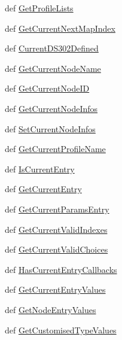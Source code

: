 \begin{CompactItemize}
def \hyperlink{classnodemanager_1_1NodeManager_26b88c9b0e6e72934ec591e8b974000c}{Get\-Profile\-Lists}
\item 
def \hyperlink{classnodemanager_1_1NodeManager_2db6aadfa79b0b2a9cfd09e45b71f03c}{Get\-Current\-Next\-Map\-Index}
\item 
def \hyperlink{classnodemanager_1_1NodeManager_5e8172882f6252e45bdb59f7248c83d6}{Current\-DS302Defined}
\item 
def \hyperlink{classnodemanager_1_1NodeManager_e2bbc613898b9926f47be95072c64160}{Get\-Current\-Node\-Name}
\item 
def \hyperlink{classnodemanager_1_1NodeManager_72f10793222cbd6d4b621ce748acf141}{Get\-Current\-Node\-ID}
\item 
def \hyperlink{classnodemanager_1_1NodeManager_9305e3ffee31917d098f2131301ec1a5}{Get\-Current\-Node\-Infos}
\item 
def \hyperlink{classnodemanager_1_1NodeManager_300207ada996fc01af2b3a2ab882d799}{Set\-Current\-Node\-Infos}
\item 
def \hyperlink{classnodemanager_1_1NodeManager_eee0741327de398df87e8916995ad8f5}{Get\-Current\-Profile\-Name}
\item 
def \hyperlink{classnodemanager_1_1NodeManager_97c725e85f609c7b5a17ff95dbb08aea}{Is\-Current\-Entry}
\item 
def \hyperlink{classnodemanager_1_1NodeManager_583794f09cbd29d97ba0cf0c43acfc85}{Get\-Current\-Entry}
\item 
def \hyperlink{classnodemanager_1_1NodeManager_92f2a252611dc624b8dca4df6b4fe1cb}{Get\-Current\-Params\-Entry}
\item 
def \hyperlink{classnodemanager_1_1NodeManager_d94d7b584774b19dc7837c5a13ad4432}{Get\-Current\-Valid\-Indexes}
\item 
def \hyperlink{classnodemanager_1_1NodeManager_0c3c317016818a79581f63b14d16c2da}{Get\-Current\-Valid\-Choices}
\item 
def \hyperlink{classnodemanager_1_1NodeManager_e1be8def7949033e446a646dc67647c6}{Has\-Current\-Entry\-Callbacks}
\item 
def \hyperlink{classnodemanager_1_1NodeManager_ea668e18d26d0b47fbbed4f6eb920100}{Get\-Current\-Entry\-Values}
\item 
def \hyperlink{classnodemanager_1_1NodeManager_70a4ab2beffa0508c94e2e5c29807d18}{Get\-Node\-Entry\-Values}
\item 
def \hyperlink{classnodemanager_1_1NodeManager_587b1972ff83655696f30d4bb87894a4}{Get\-Customised\-Type\-Values}
\item 

\end{CompactItemize}
